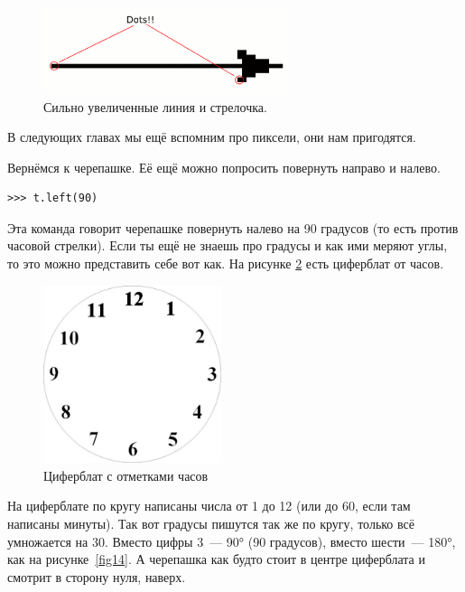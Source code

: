 \begin{figure}
\begin{center}
\includegraphics[width=72mm]{../en/figure12.eps}
\end{center}
\caption{Сильно увеличенные линия и стрелочка.}\label{fig12}
\end{figure}

В следующих главах мы ещё вспомним про пиксели, они нам пригодятся.

Вернёмся к черепашке. Её ещё можно попросить повернуть направо и налево.

\begin{listing}
\begin{verbatim}
>>> t.left(90)
\end{verbatim}
\end{listing}

Эта команда говорит черепашке повернуть налево на 90 градусов (то есть против часовой стрелки). Если ты ещё не знаешь про градусы и как ими меряют углы, то это можно представить себе вот как. На рисунке \ref{fig13} есть циферблат от часов.

\begin{figure}
\begin{center}
\includegraphics[width=52mm]{../en/figure13.eps}
\end{center}
\caption{Циферблат с отметками часов}\label{fig13}
\end{figure}

На циферблате по кругу написаны числа от 1 до 12 (или до 60, если там написаны минуты). Так вот градусы пишутся так же по кругу, только всё умножается на 30. Вместо цифры 3 — 90° (90 градусов), вместо шести — 180°, как на рисунке \ref{fig14}. А черепашка как будто стоит в центре циферблата и смотрит в сторону нуля, наверх.

